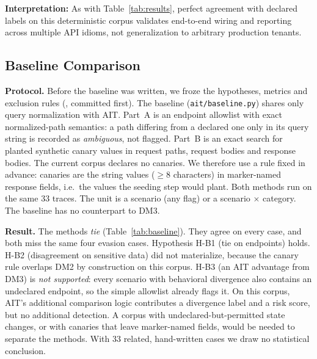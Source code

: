 \documentclass[conference]{IEEEtran}
\begin{document}
\noindent\textbf{Interpretation:} As with Table~\ref{tab:results},
perfect agreement with declared labels on this deterministic corpus
validates end-to-end wiring and reporting across multiple API idioms,
not generalization to arbitrary production tenants.

\subsection{Baseline Comparison}
\label{sec:baseline}

\textbf{Protocol.} Before the baseline was written, we froze the
hypotheses, metrics and exclusion rules
(, committed
first). The baseline (\texttt{ait/baseline.py}) shares only query
normalization with AIT. Part~A is an endpoint allowlist with exact
normalized-path semantics: a path differing from a declared one only
in its query string is recorded as \emph{ambiguous}, not flagged.
Part~B is an exact search for planted synthetic canary values in request
paths, request bodies and response bodies. The current corpus declares
no canaries. We therefore use a rule fixed in advance: canaries are the
string values ($\geq$8 characters) in marker-named response fields,
i.e.\ the values the seeding step would plant. Both methods run on the
same 33 traces. The unit is a scenario (any flag) or a scenario $\times$
category. The baseline has no counterpart to DM3.

\begin{table}[htbp]
  \caption{AIT vs.\ Two-Part Baseline on the Development Corpus
  (identical traces; raw counts; author-written scenarios)}
  \label{tab:baseline}
  \centering
  \renewcommand{\arraystretch}{1.15}
  \footnotesize
  
\end{table}

\noindent\textbf{Result.} The methods \emph{tie} (Table~\ref{tab:baseline}).
They agree on every case, and both miss the same four evasion cases.
Hypothesis H-B1 (tie on endpoints) holds. H-B2 (disagreement on
sensitive data) did not materialize, because the canary rule overlaps
DM2 by construction on this corpus. H-B3 (an AIT advantage from DM3)
is \emph{not supported}: every scenario with behavioral divergence also
contains an undeclared endpoint, so the simple allowlist already flags
it. On this corpus, AIT's additional comparison logic contributes a
divergence label and a risk score, but no additional detection. A
corpus with undeclared-but-permitted state changes, or with canaries
that leave marker-named fields, would be needed to separate the methods.
With 33 related, hand-written cases we draw no statistical conclusion.
\end{document}
